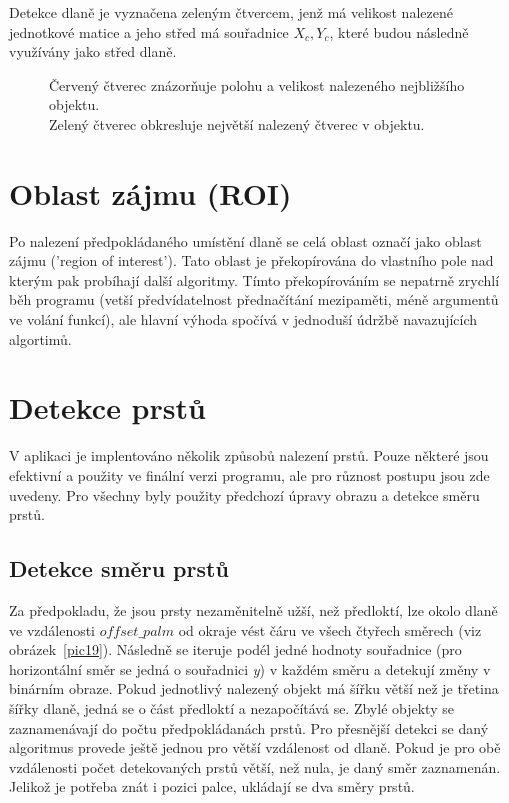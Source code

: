 Detekce dlaně je vyznačena zeleným čtvercem, jenž má velikost nalezené jednotkové matice a jeho střed má souřadnice $ X_{c}, Y_{c} $, které budou následně využívány jako střed dlaně.

\begin{figure}[htp]
\centering
{}
\caption{Červený čtverec znázorňuje polohu a velikost nalezeného nejbližšího objektu.\\
Zelený čtverec obkresluje největší nalezený čtverec v objektu.}
\label{pic18}
\end{figure}

\section{Oblast zájmu (ROI)}
Po nalezení předpokládaného umístění dlaně se celá oblast označí jako oblast zájmu ('region of interest'). Tato oblast je překopírována do vlastního pole nad kterým pak probíhají další algoritmy. Tímto překopírováním se nepatrně zrychlí běh programu (vetší předvídatelnost přednačítání mezipaměti, méně argumentů ve volání funkcí), ale hlavní výhoda spočívá v jednoduší údržbě navazujících algortimů.

\section{Detekce prstů}
V aplikaci je implentováno několik způsobů nalezení prstů. Pouze některé jsou efektivní a použity ve finální verzi programu, ale pro různost postupu jsou zde uvedeny. Pro všechny byly použity předchozí úpravy obrazu a detekce směru prstů.

\subsection{Detekce směru prstů}
Za předpokladu, že jsou prsty nezaměnitelně užší, než předloktí, lze okolo dlaně ve vzdálenosti $ offset\_palm $ od okraje vést čáru ve všech čtyřech směrech (viz obrázek~\ref{pic19}). Následně se iteruje podél jedné hodnoty souřadnice (pro horizontální směr se jedná o souřadnici \textit{y}) v každém směru a detekují změny v binárním obraze. Pokud jednotlivý nalezený objekt má šířku větší než je třetina šířky dlaně, jedná se o část předloktí a nezapočítává se. Zbylé objekty se zaznamenávají do počtu předpokládanách prstů.  Pro přesnější detekci se daný algoritmus provede ještě jednou pro větší vzdálenost od dlaně. Pokud je pro obě vzdálenosti počet detekovaných prstů větší, než nula, je daný směr zaznamenán. Jelikož je potřeba znát i pozici palce, ukládají se dva směry prstů.

